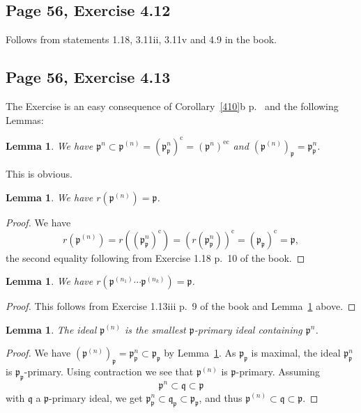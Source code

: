 \documentclass[parskip=half,fontsize=12pt]{scrartcl}%
\newcommand{\oo}{\operatorname}\newcommand{\ooo}{\operatorname*}
\newcommand{\mf}{\mathfrak}
\newcommand{\ppp}{\mf p}
\newcommand{\qqq}{\mf q}
\newtheorem{lem}[thm]{Lemma}
\begin{document}
\subsection{Page 56, Exercise 4.12}%

Follows from statements 1.18, 3.11ii, 3.11v and 4.9 in the book.

\subsection{Page 56, Exercise 4.13}%

The Exercise is an easy consequence of Corollary~\ref{410}b p.~\pageref{410} and the following Lemmas:

\begin{lem}\label{413c}
We have $\ppp^n\subset\ppp^{(n)}=\left(\ppp_\ppp^n\right)^{\oo c}=\left(\ppp^n\right)^{\oo{ec}}$ and $\left(\ppp^{(n)}\right)_\ppp=\ppp_\ppp^n$. 
\end{lem}
This is obvious.

\begin{lem}\label{413a}
We have $r\left(\ppp^{(n)}\right)=\ppp$. 
\end{lem}
\begin{proof}
We have 
$$
r\left(\ppp^{(n)}\right)=r\left(\left(\ppp_\ppp^n\right)^{\oo c}\right)=\left(r\left(\ppp_\ppp^n\right)\right)^{\oo c}=(\ppp_\ppp)^{\oo c}=\ppp,
$$ 
the second equality following from Exercise 1.18 p.~10 of the book. 
\end{proof} 

\begin{lem}
We have $r\left(\ppp^{(n_1)}\cdots\ppp^{(n_k)}\right)=\ppp$. 
\end{lem}
\begin{proof}
This follows from Exercise 1.13iii p.~9 of the book and Lemma~\ref{413a} above.
\end{proof}

\begin{lem}\label{413b}
The ideal $\ppp^{(n)}$ is the smallest $\ppp$-primary ideal containing $\ppp^n$. 
\end{lem}
\begin{proof}
We have $(\ppp^{(n)})_\ppp=\ppp_\ppp^{n}\subset\ppp_\ppp$ by Lemma~\ref{413c}. As $\ppp_\ppp$ is maximal, the ideal $\ppp^n_\ppp$ is $\ppp_\ppp$-primary. Using contraction we see that $\ppp^{(n)}$ is $\ppp$-primary. Assuming 
$$
\ppp^n\subset\qqq\subset\ppp
$$ 
with $\qqq$ a $\ppp$-primary ideal, we get $\ppp^n_\ppp\subset\qqq_\ppp\subset\ppp_\ppp$, and thus $\ppp^{(n)}\subset\qqq\subset\ppp$. 
\end{proof}
\end{document}
